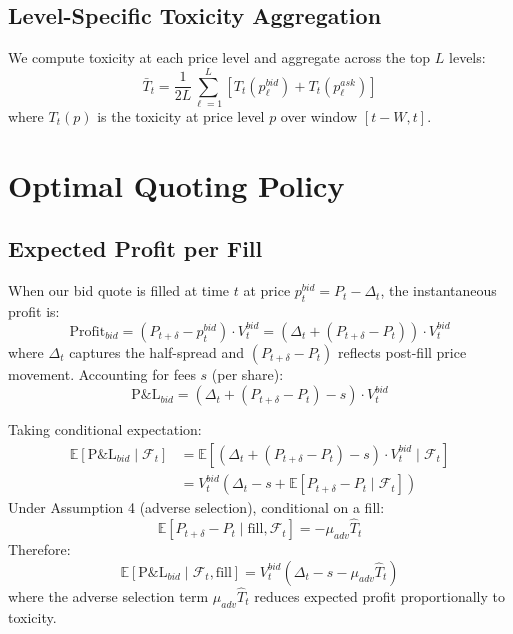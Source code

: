 \documentclass[11pt]{article}
\theoremstyle{definition}
\begin{document}
\subsection{Level-Specific Toxicity Aggregation}

We compute toxicity at each price level and aggregate across the top $L$ levels:
\begin{equation}
\bar{T}_t = \frac{1}{2L} \sum_{\ell=1}^{L} \left[T_t(p_\ell^{bid}) + T_t(p_\ell^{ask})\right]
\end{equation}
where $T_t(p)$ is the toxicity at price level $p$ over window $[t-W, t]$.

\section{Optimal Quoting Policy}

\subsection{Expected Profit per Fill}

When our bid quote is filled at time $t$ at price $p_t^{bid} = P_t - \Delta_t$, the instantaneous profit is:
\begin{equation}
\text{Profit}_{bid} = (P_{t+\delta} - p_t^{bid}) \cdot V_t^{bid} = \left(\Delta_t + (P_{t+\delta} - P_t)\right) \cdot V_t^{bid}
\end{equation}
where $\Delta_t$ captures the half-spread and $(P_{t+\delta} - P_t)$ reflects post-fill price movement. Accounting for fees $s$ (per share):
\begin{equation}
\text{P\&L}_{bid} = \left(\Delta_t + (P_{t+\delta} - P_t) - s\right) \cdot V_t^{bid}
\end{equation}

Taking conditional expectation:
\begin{align}
\mathbb{E}[\text{P\&L}_{bid} \mid \mathcal{F}_t] &= \mathbb{E}\left[\left(\Delta_t + (P_{t+\delta} - P_t) - s\right) \cdot V_t^{bid} \mid \mathcal{F}_t\right] \\
&= V_t^{bid} \left(\Delta_t - s + \mathbb{E}[P_{t+\delta} - P_t \mid \mathcal{F}_t]\right)
\end{align}
Under Assumption 4 (adverse selection), conditional on a fill:
\begin{equation}
\mathbb{E}[P_{t+\delta} - P_t \mid \text{fill}, \mathcal{F}_t] = -\mu_{adv} \hat{T}_t
\end{equation}
Therefore:
\begin{equation}
\mathbb{E}[\text{P\&L}_{bid} \mid \mathcal{F}_t, \text{fill}] = V_t^{bid} \left(\Delta_t - s - \mu_{adv} \hat{T}_t\right)
\end{equation}
where the adverse selection term $\mu_{adv} \hat{T}_t$ reduces expected profit proportionally to toxicity.
\end{document}
